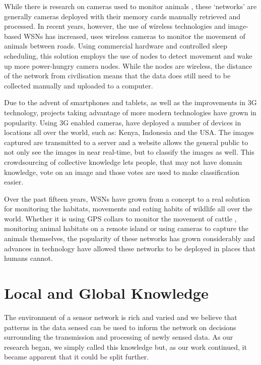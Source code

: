	While there is research on cameras used to monitor animals \cite{Kays2009, Ahumada2011a}, these ‘networks’ are generally cameras deployed with their memory cards manually retrieved and processed. In recent years, however, the use of wireless technologies and image-based WSNs has increased, \cite{Garcia-Sanchez2010b} uses wireless cameras to monitor the movement of animals between roads. Using commercial hardware and controlled sleep scheduling, this solution employs the use of nodes to detect movement and wake up more power-hungry camera nodes. While the nodes are wireless, the distance of the network from civilisation means that the data does still need to be collected manually and uploaded to a computer.

	Due to the advent of smartphones and tablets, as well as the improvements in 3G technology, projects taking advantage of more modern technologies have grown in popularity. Using 3G enabled cameras, \cite{ZSL} have deployed a number of devices in locations all over the world, such as: Kenya, Indonesia and the USA. The images captured are transmitted to a server and a website allows the general public to not only see the images in near real-time, but to classify the images as well. This crowdsourcing of collective knowledge lets people, that may not have domain knowledge, vote on an image and those votes are used to make classification easier.

	Over the past fifteen years, WSNs have grown from a concept to a real solution for monitoring the habitats, movements and eating habits of wildlife all over the world. Whether it is using GPS collars to monitor the movement of cattle \cite{Juang2002}, monitoring animal habitats on a remote island or using cameras to capture the animals themselves, the popularity of these networks has grown considerably and advances in technology have allowed these networks to be deployed in places that humans cannot.

\section{Local and Global Knowledge} \label{bg:lgk}
	The environment of a sensor network is rich and varied and we believe that patterns in the data sensed can be used to inform the network on decisions surrounding the transmission and processing of newly sensed data. As our research began, we simply called this knowledge but, as our work continued, it became apparent that it could be split further.

